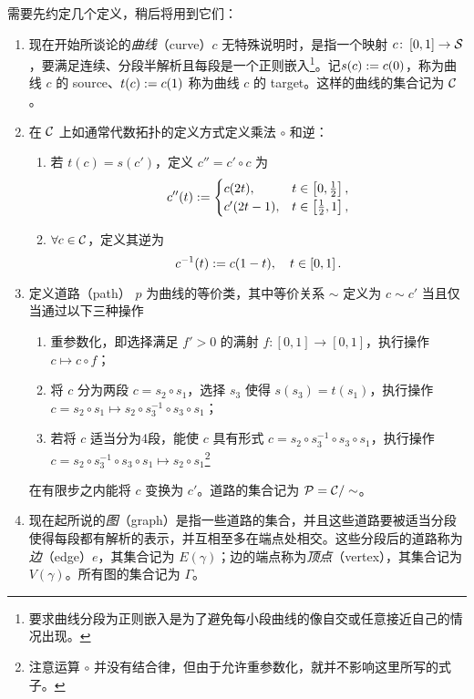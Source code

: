 			需要先约定几个定义，稍后将用到它们：
			\begin{Definition}
				\begin{enumerate}
					\item 现在开始所谈论的\emph{曲线}（curve）$c$ 无特殊说明时，是指一个映射 $c\colon \left[ 0,1 \right] \rightarrow \mathcal{S}$，要满足连续、分段半解析且每段是一个正则嵌入\footnote{要求曲线分段为正则嵌入是为了避免每小段曲线的像自交或任意接近自己的情况出现。}。记$s(c):= c(0)$，称为曲线 $c$ 的 source、$t(c):= c(1)$ 称为曲线 $c$ 的 target。这样的曲线的集合记为 $\mathcal{C}$。
					\item 在 $\mathcal{C}$ 上如通常代数拓扑的定义方式定义乘法 $\circ$ 和逆：
					\begin{enumerate}
						\item 若 $t(c) = s(c')$，定义 $c'' = c' \circ c$ 为
						\begin{equation}
							c''(t) :=
							\begin{cases}
								c(2t), & t \in \left[ 0, \frac{1}{2} \right],\\
								c'(2t-1), & t \in \left[ \frac{1}{2}, 1 \right],
							\end{cases}
						\end{equation}
						\item $\forall c \in \mathcal{C}$，定义其逆为
						\begin{equation}
							c^{-1}(t) \definedby c(1-t) \qc t \in \left[ 0,1 \right].
						\end{equation}
					\end{enumerate}
					\item 定义道路（path） $p$ 为曲线的等价类，其中等价关系 $\sim$ 定义为 $c\sim c'$ 当且仅当通过以下三种操作
					\begin{enumerate}
						\item 重参数化，即选择满足 $f'>0$ 的满射 $f\colon \left[ 0,1 \right] \rightarrow \left[ 0,1 \right]$，执行操作 $c \mapsto c\circ f$；
						\item 将 $c$ 分为两段 $c = s_2 \circ s_1$，选择 $s_3$ 使得 $s(s_3) = t(s_1)$，执行操作 $c = s_2 \circ s_1 \mapsto s_2 \circ s_3^{-1} \circ s_3 \circ s_1$；
						\item 若将 $c$ 适当分为4段，能使 $c$ 具有形式 $c= s_2 \circ s_3^{-1} \circ s_3 \circ s_1$，执行操作 $c= s_2 \circ s_3^{-1} \circ s_3 \circ s_1 \mapsto s_2 \circ s_1$\footnote{注意运算 $\circ$ 并没有结合律，但由于允许重参数化，就并不影响这里所写的式子。}
					\end{enumerate}
					在有限步之内能将 $c$ 变换为 $c'$。道路的集合记为 $\mathcal{P} = \mathcal{C}/ \sim$。
					\item 现在起所说的\emph{图}（graph）是指一些道路的集合，并且这些道路要被适当分段使得每段都有解析的表示，并互相至多在端点处相交。这些分段后的道路称为\emph{边}（edge）$e$，其集合记为 $E(\gamma)$；边的端点称为\emph{顶点}（vertex），其集合记为 $V(\gamma)$。所有图的集合记为 $\Gamma$。
				\end{enumerate}
			\end{Definition}

